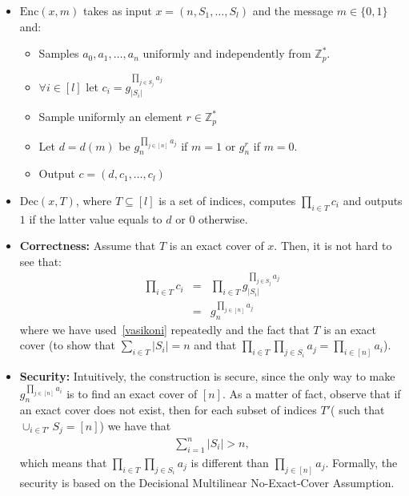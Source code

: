 \begin{itemize}

\item $\mathrm{Enc}(x,m)$ takes as input $x=(n, S_1, \ldots,S_l)$ and the message $m \in \{0,1\}$ and:

\begin{itemize}

\item Samples $a_{0}, a_1, \ldots, a_{n}$ uniformly and independently from $\mathbb{Z}_p^*$.

\item $\forall i \in [l]$ let $c_i = g^{\prod_{j\in S_j} a_j}_{|S_i|}$

\item Sample uniformly an element $r \in \mathbb{Z}_p^*$

\item Let $d = d(m) $ be $  g_n^{\prod_{j \in [n]}a_j}$ if $m = 1 $ or $g_n^r$ if $m = 0$.

\item Output $c = (d, c_1, \ldots,c_l)$
\end{itemize}

\item $\mathrm{Dec}(x,T)$, where $T \subseteq[l]$ is a set of indices, computes $\prod_{i \in T}c_i$ and outputs $1$ if the latter value equals to $d$ or $0$ otherwise.

\end{itemize}


\begin{itemize}

\item \textbf{Correctness:} Assume that $T$ is an exact cover of $x$. Then, it is not hard to see that:
\begin{eqnarray*}
\prod_{i \in T} c_i & = & \prod_{i \in T} g^{\prod_{j\in S_j} a_j}_{|S_i|} \\
& = & g_n^{\prod_{j \in [n]}a_j}
\end{eqnarray*}
where we have used~\eqref{vasikoni} repeatedly and the fact that $T$ is an exact cover (to show that $\sum_{i \in T} |S_i| = n$ and that $\prod_{i \in T} \prod_{j \in S_i} a_j = \prod_{i \in [n]} a_i$).

\item \textbf{Security:} Intuitively, the construction is secure, since the only way to make $g_n^{\prod_{ j \in [n] }a_i}$ is to find an exact cover of $[n]$.  As a matter of fact, observe that if an exact cover does not exist, then for each subset of indices $T'$( such that $\cup_{i \in T'}S_j  = [n]$) we have that
\begin{align*}
\sum_{i =1 }^{n} |S_i| > n,
\end{align*}
which means that   $\prod_{i \in T} \prod_{j \in S_i} a_j$ is different than $\prod_{j \in [n]}a_j$. Formally, the security is based on the Decisional Multilinear No-Exact-Cover Assumption.

\end{itemize}


